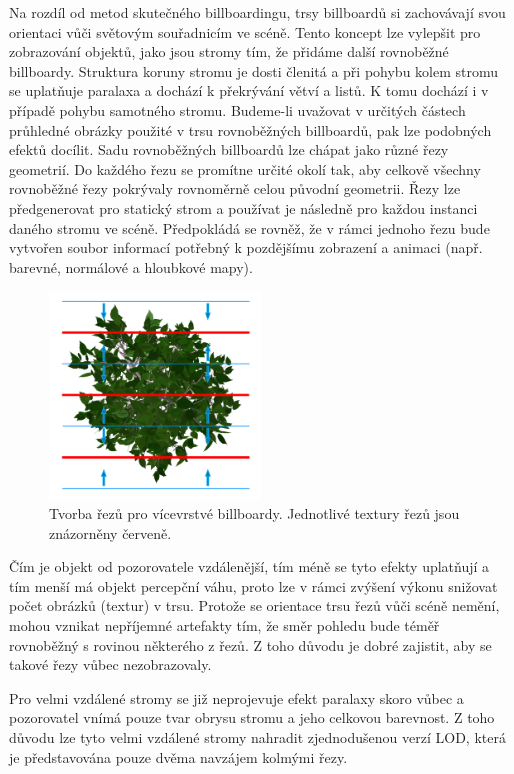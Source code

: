 Na rozdíl od metod skutečného billboardingu, trsy billboardů si zachovávají svou orientaci vůči světovým souřadnicím ve scéně. Tento koncept lze vylepšit pro zobrazování objektů, jako jsou stromy tím, že přidáme další rovnoběžné billboardy. Struktura koruny stromu je dosti členitá a při pohybu kolem stromu se uplatňuje paralaxa a dochází k překrývání větví a listů. K tomu dochází i v případě pohybu samotného stromu. Budeme-li uvažovat v určitých částech průhledné obrázky použité v trsu rovnoběžných billboardů, pak lze podobných efektů docílit. Sadu rovnoběžných billboardů lze chápat jako různé řezy geometrií. Do každého řezu se promítne určité okolí tak, aby celkově všechny rovnoběžné řezy pokrývaly rovnoměrně celou původní geometrii. Řezy lze předgenerovat pro statický strom a používat je následně pro každou instanci daného stromu ve scéně. Předpokládá se rovněž, že v rámci jednoho řezu bude vytvořen soubor informací potřebný k pozdějšímu zobrazení a animaci (např. barevné, normálové a hloubkové mapy).
\begin{figure}[!hbt]
\begin{center}
\includegraphics[width=0.5\textwidth]{./figures/slices.png}
\caption[Tvorba řezů pro vícevrstvé billboardy]%
{ Tvorba řezů pro vícevrstvé billboardy. Jednotlivé textury řezů jsou znázorněny červeně. }
\end{center}
\label{fig:slicing}
\end{figure}
Čím je objekt od pozorovatele vzdálenější, tím méně se tyto efekty uplatňují a tím menší má objekt percepční váhu, proto lze v rámci zvýšení výkonu snižovat počet obrázků (textur) v trsu.
Protože se orientace trsu řezů vůči scéně nemění, mohou vznikat nepříjemné artefakty tím, že směr pohledu bude téměř rovnoběžný s rovinou některého z řezů. Z toho důvodu je dobré zajistit, aby se takové řezy vůbec nezobrazovaly. 

Pro velmi vzdálené stromy se již neprojevuje efekt paralaxy skoro vůbec a pozorovatel vnímá pouze tvar obrysu stromu a jeho celkovou barevnost. Z toho důvodu lze tyto velmi vzdálené stromy nahradit zjednodušenou verzí LOD, která je představována pouze dvěma navzájem kolmými řezy.  


